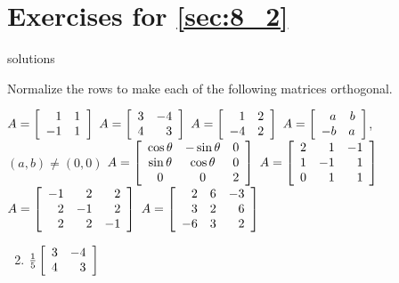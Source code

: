 \section*{Exercises for \ref{sec:8_2}}

\begin{Filesave}{solutions}
\end{Filesave}

\begin{multicols}{2}
\begin{ex}
Normalize the rows to make each of the following matrices orthogonal.

\begin{exenumerate}[column-sep=-5em]
\exitem $A = \left[ \begin{array}{rr}
1 & 1 \\
-1 & 1
\end{array}\right]$
\exitem $A = \left[ \begin{array}{rr}
3 & -4 \\
4 & 3
\end{array}\right]$
\exitem* $A = \left[ \begin{array}{rr}
1 & 2 \\
-4 & 2
\end{array}\right]$
\exitem* $A = \left[ \begin{array}{rr}
a & b \\
-b & a
\end{array}\right]$, $(a,b) \neq (0,0)$
\exitem* $A = \left[ \begin{array}{ccc}
\cos\theta & -\sin\theta & 0 \\
\sin\theta & \cos\theta & 0 \\
0 & 0 & 2 
\end{array}\right]$
\exitem* $A = \left[ \begin{array}{rrr}
2 & 1 & -1 \\
1 & -1 & 1 \\
0 & 1 & 1 
\end{array}\right]$
\exitem* $A = \left[ \begin{array}{rrr}
-1 & 2 & 2 \\
2 & -1 & 2 \\
2 & 2 & -1 
\end{array}\right]$
\exitem* $A = \left[ \begin{array}{rrr}
2 & 6 & -3 \\
3 & 2 & 6 \\
-6 & 3 & 2 
\end{array}\right]$
\end{exenumerate}
\begin{sol}
\begin{enumerate}[label={\alph*.}]
\setcounter{enumi}{1}
\item  $\tfrac{1}{5}\left[ \begin{array}{rr}
3 & -4 \\
4 & 3
\end{array}\right]$


\end{enumerate}
\end{sol}
\end{ex}
\end{multicols}
